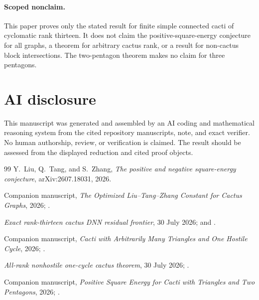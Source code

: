 \documentclass[11pt]{article}
\begin{document}
\paragraph{Scoped nonclaim.}
This paper proves only the stated result for finite simple connected cacti of
cyclomatic rank thirteen.  It does not claim the positive-square-energy
conjecture for all graphs, a theorem for arbitrary cactus rank, or a result for
non-cactus block intersections.  The two-pentagon theorem makes no claim for
three pentagons.

\section*{AI disclosure}
This manuscript was generated and assembled by an AI coding and mathematical
reasoning system from the cited repository manuscripts, note, and exact
verifier.  No human authorship, review, or verification is claimed.  The result
should be assessed from the displayed reduction and cited proof objects.

\begin{thebibliography}{99}
 Y.~Liu, Q.~Tang, and S.~Zhang,
\emph{The positive and negative square-energy conjecture}, arXiv:2607.18031,
2026.

 Companion manuscript, \emph{The Optimized Liu--Tang--Zhang
Constant for Cactus Graphs}, 2026; .

 \emph{Exact rank-thirteen cactus DNN residual frontier},
30 July 2026;
 and
.

 Companion manuscript, \emph{Cacti with Arbitrarily Many
Triangles and One Hostile Cycle}, 2026;
.

 \emph{All-rank nonhostile one-cycle cactus theorem},
30 July 2026;
.

 Companion manuscript, \emph{Positive Square Energy for Cacti
with Triangles and Two Pentagons}, 2026;
.
\end{thebibliography}
\end{document}
